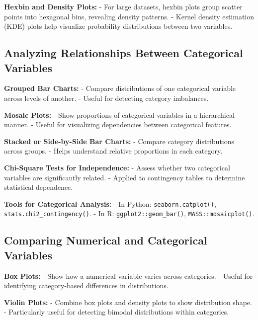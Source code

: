 \documentclass[12pt,openany]{book}
\begin{document}
\textbf{Hexbin and Density Plots:}
- For large datasets, hexbin plots group scatter points into hexagonal bins, revealing density patterns.
- Kernel density estimation (KDE) plots help visualize probability distributions between two variables.
\newline


\subsection{Analyzing Relationships Between Categorical Variables}

\textbf{Grouped Bar Charts:}
- Compare distributions of one categorical variable across levels of another.
- Useful for detecting category imbalances.
\newline

\textbf{Mosaic Plots:}
- Show proportions of categorical variables in a hierarchical manner.
- Useful for visualizing dependencies between categorical features.
\newline

\textbf{Stacked or Side-by-Side Bar Charts:}
- Compare category distributions across groups.
- Helps understand relative proportions in each category.
\newline

\textbf{Chi-Square Tests for Independence:}
- Assess whether two categorical variables are significantly related.
- Applied to contingency tables to determine statistical dependence.
\newline

\textbf{Tools for Categorical Analysis:}
- In Python: \texttt{seaborn.catplot()}, \texttt{stats.chi2\_contingency()}.
- In R: \texttt{ggplot2::geom\_bar()}, \texttt{MASS::mosaicplot()}.
\newline


\subsection{Comparing Numerical and Categorical Variables}

\textbf{Box Plots:}
- Show how a numerical variable varies across categories.
- Useful for identifying category-based differences in distributions.
\newline

\textbf{Violin Plots:}
- Combine box plots and density plots to show distribution shape.
- Particularly useful for detecting bimodal distributions within categories.
\newline
\end{document}
